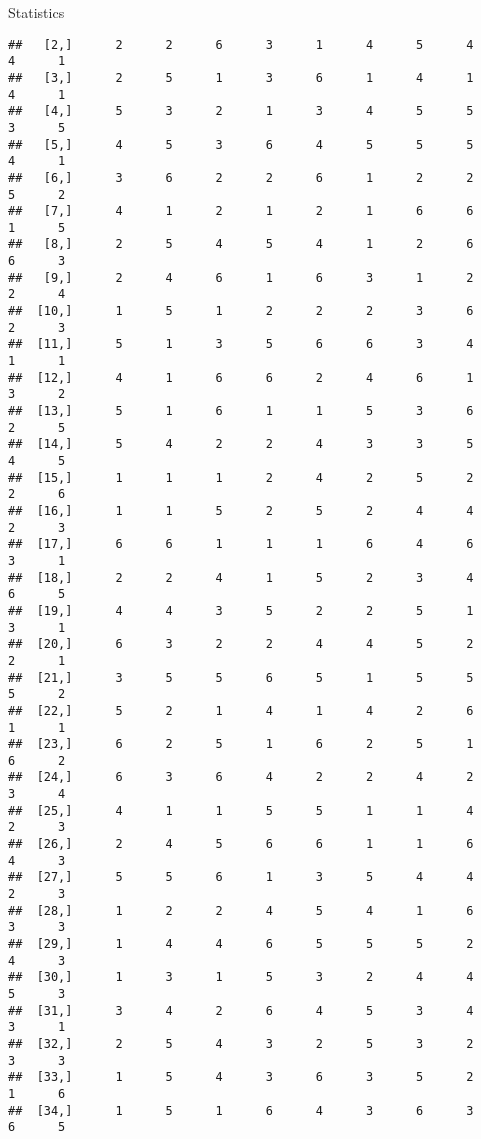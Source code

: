 \documentclass[
  ignorenonframetext,
]{beamer}
\begin{document}
\begin{frame}[fragile]{Statistics}
\begin{verbatim}
##   [2,]      2      2      6      3      1      4      5      4      4      1
##   [3,]      2      5      1      3      6      1      4      1      4      1
##   [4,]      5      3      2      1      3      4      5      5      3      5
##   [5,]      4      5      3      6      4      5      5      5      4      1
##   [6,]      3      6      2      2      6      1      2      2      5      2
##   [7,]      4      1      2      1      2      1      6      6      1      5
##   [8,]      2      5      4      5      4      1      2      6      6      3
##   [9,]      2      4      6      1      6      3      1      2      2      4
##  [10,]      1      5      1      2      2      2      3      6      2      3
##  [11,]      5      1      3      5      6      6      3      4      1      1
##  [12,]      4      1      6      6      2      4      6      1      3      2
##  [13,]      5      1      6      1      1      5      3      6      2      5
##  [14,]      5      4      2      2      4      3      3      5      4      5
##  [15,]      1      1      1      2      4      2      5      2      2      6
##  [16,]      1      1      5      2      5      2      4      4      2      3
##  [17,]      6      6      1      1      1      6      4      6      3      1
##  [18,]      2      2      4      1      5      2      3      4      6      5
##  [19,]      4      4      3      5      2      2      5      1      3      1
##  [20,]      6      3      2      2      4      4      5      2      2      1
##  [21,]      3      5      5      6      5      1      5      5      5      2
##  [22,]      5      2      1      4      1      4      2      6      1      1
##  [23,]      6      2      5      1      6      2      5      1      6      2
##  [24,]      6      3      6      4      2      2      4      2      3      4
##  [25,]      4      1      1      5      5      1      1      4      2      3
##  [26,]      2      4      5      6      6      1      1      6      4      3
##  [27,]      5      5      6      1      3      5      4      4      2      3
##  [28,]      1      2      2      4      5      4      1      6      3      3
##  [29,]      1      4      4      6      5      5      5      2      4      3
##  [30,]      1      3      1      5      3      2      4      4      5      3
##  [31,]      3      4      2      6      4      5      3      4      3      1
##  [32,]      2      5      4      3      2      5      3      2      3      3
##  [33,]      1      5      4      3      6      3      5      2      1      6
##  [34,]      1      5      1      6      4      3      6      3      6      5

\end{verbatim}
\end{frame}
\end{document}
